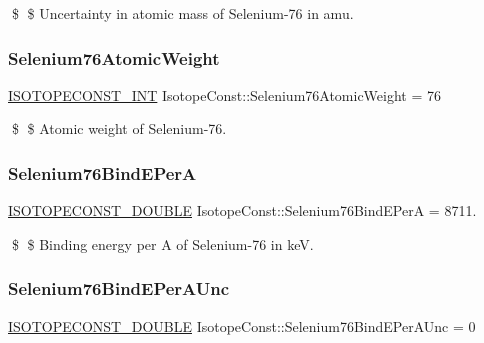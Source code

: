\$ \$ Uncertainty in atomic mass of Selenium-\/76 in amu. \mbox{\label{group___isotope_const-_selenium-_se76_gab806d631ffcce398a025093fef030dc1}} 
\subsubsection{\texorpdfstring{Selenium76\+Atomic\+Weight}{Selenium76AtomicWeight}}
{\footnotesize\ttfamily \mbox{\hyperlink{group___isotope_const-_macros_ga5f18360b3e99483a35c32d789e62621c}{I\+S\+O\+T\+O\+P\+E\+C\+O\+N\+S\+T\+\_\+\+I\+NT}} Isotope\+Const\+::\+Selenium76\+Atomic\+Weight = 76}

\$ \$ Atomic weight of Selenium-\/76. \mbox{\label{group___isotope_const-_selenium-_se76_gae6d9fb11b489426c6ad2534f5ddd7dcd}} 
\subsubsection{\texorpdfstring{Selenium76\+Bind\+E\+PerA}{Selenium76BindEPerA}}
{\footnotesize\ttfamily \mbox{\hyperlink{group___isotope_const-_macros_ga8f45a7272ce02c0b4c65c44636ed719a}{I\+S\+O\+T\+O\+P\+E\+C\+O\+N\+S\+T\+\_\+\+D\+O\+U\+B\+LE}} Isotope\+Const\+::\+Selenium76\+Bind\+E\+PerA = 8711.}

\$ \$ Binding energy per A of Selenium-\/76 in keV. \mbox{\label{group___isotope_const-_selenium-_se76_gab199a401a89f983f8ccb5091256666dd}} 
\subsubsection{\texorpdfstring{Selenium76\+Bind\+E\+Per\+A\+Unc}{Selenium76BindEPerAUnc}}
{\footnotesize\ttfamily \mbox{\hyperlink{group___isotope_const-_macros_ga8f45a7272ce02c0b4c65c44636ed719a}{I\+S\+O\+T\+O\+P\+E\+C\+O\+N\+S\+T\+\_\+\+D\+O\+U\+B\+LE}} Isotope\+Const\+::\+Selenium76\+Bind\+E\+Per\+A\+Unc = 0}

